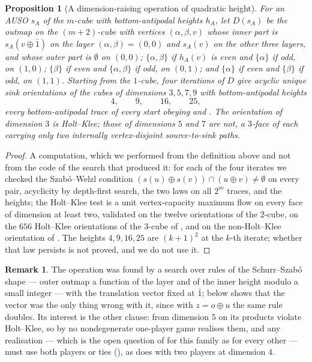 \documentclass[11pt]{article}
\theoremstyle{plain}
\newtheorem{proposition}[theorem]{Proposition}
\theoremstyle{definition}
\newtheorem{remark}[theorem]{Remark}
\begin{document}
\begin{proposition}[A dimension-raising operation of quadratic height]\label{prop:D-quadratic}
For an AUSO $s_A$ of the $m$-cube with bottom-antipodal heights $h_A$, let
$D(s_A)$ be the outmap on the $(m+2)$-cube with vertices $(\alpha,\beta,v)$
whose inner part is $s_A(v\oplus\bar1)$ on the layer $(\alpha,\beta)=(0,0)$
and $s_A(v)$ on the other three layers, and whose outer part is
$\emptyset$ on $(0,0)$; $\{\alpha,\beta\}$ if $h_A(v)$ is even and
$\{\alpha\}$ if odd, on $(1,0)$; $\{\beta\}$ if even and $\{\alpha,\beta\}$
if odd, on $(0,1)$; and $\{\alpha\}$ if even and $\{\beta\}$ if odd, on
$(1,1)$. Starting from the $1$-cube, four iterations of $D$ give acyclic
unique sink orientations of the cubes of dimensions $3,5,7,9$ with
bottom-antipodal heights
\[
  4,\qquad 9,\qquad 16,\qquad 25,
\]
every bottom-antipodal trace of every start obeying 
and . The orientation of dimension $3$ is Holt--Klee; those
of dimensions $5$ and $7$ are not, a $3$-face of each carrying only two
internally vertex-disjoint source-to-sink paths.
\end{proposition}

\begin{proof}
A computation, which we performed from the definition above and not from
the code of the search that produced it: for each of the four iterates we
checked the Szab\'o--Welzl condition $(s(u)\oplus s(v))\cap(u\oplus v)\ne
\emptyset$ on every pair, acyclicity by depth-first search, the two laws on
all $2^{m}$ traces, and the heights; the Holt--Klee test is a unit
vertex-capacity maximum flow on every face of dimension at least two,
validated on the twelve orientations of the $2$-cube, on the $656$
Holt--Klee orientations of the $3$-cube of , and on
the non-Holt--Klee orientation of . The heights
$4,9,16,25$ are $(k+1)^{2}$ at the $k$-th iterate; whether that law
persists is not proved, and we do not use it.
\end{proof}

\begin{remark}\label{rem:D-quadratic}
The operation was found by a search over rules of the Schurr--Szab\'o shape
--- outer outmap a function of the layer and of the inner height modulo a
small integer --- with the translation vector fixed at $\bar1$;
 below shows that the vector was the only thing wrong with
it, since with $z=o\oplus u$ the same rule doubles. Its interest is the other
clause: from dimension $5$ on its products violate Holt--Klee, so by
 no nondegenerate one-player game realises them,
and any realisation --- which is the open question of 
for this family as for every other --- must use both players or ties
(), as  does with two players
at dimension $4$.
\end{remark}
\end{document}
